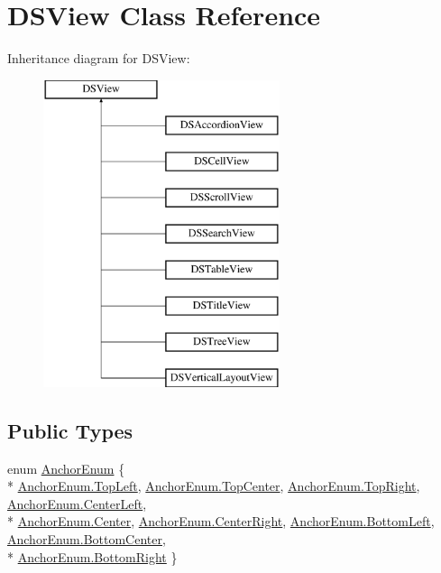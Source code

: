 \hypertarget{class_d_s_view}{\section{D\+S\+View Class Reference}
\label{class_d_s_view}
}
Inheritance diagram for D\+S\+View\+:\begin{figure}[H]
\begin{center}
\leavevmode
\includegraphics[height=9.000000cm]{class_d_s_view}
\end{center}
\end{figure}
\subsection*{Public Types}
\begin{DoxyCompactItemize}
\item 
enum \hyperlink{class_d_s_view_a8b41b9ec1b18bd33872a37cbd3a2dbe1}{Anchor\+Enum} \{ \\*
\hyperlink{class_d_s_view_a8b41b9ec1b18bd33872a37cbd3a2dbe1ab32beb056fbfe36afbabc6c88c81ab36}{Anchor\+Enum.\+Top\+Left}, 
\hyperlink{class_d_s_view_a8b41b9ec1b18bd33872a37cbd3a2dbe1a91b8ede24b7f93a98ae4dcaade15d468}{Anchor\+Enum.\+Top\+Center}, 
\hyperlink{class_d_s_view_a8b41b9ec1b18bd33872a37cbd3a2dbe1a1d85a557894c340c318493f33bfa8efb}{Anchor\+Enum.\+Top\+Right}, 
\hyperlink{class_d_s_view_a8b41b9ec1b18bd33872a37cbd3a2dbe1a9f44821a7b58abb265709f49e54ef8ca}{Anchor\+Enum.\+Center\+Left}, 
\\*
\hyperlink{class_d_s_view_a8b41b9ec1b18bd33872a37cbd3a2dbe1a4f1f6016fc9f3f2353c0cc7c67b292bd}{Anchor\+Enum.\+Center}, 
\hyperlink{class_d_s_view_a8b41b9ec1b18bd33872a37cbd3a2dbe1aa538ef718186c9e0967239bb60043d1f}{Anchor\+Enum.\+Center\+Right}, 
\hyperlink{class_d_s_view_a8b41b9ec1b18bd33872a37cbd3a2dbe1a98e5a1c44509157ebcaf46c515c78875}{Anchor\+Enum.\+Bottom\+Left}, 
\hyperlink{class_d_s_view_a8b41b9ec1b18bd33872a37cbd3a2dbe1abf7d9c8ad2f89a37cf5378b5fec0b420}{Anchor\+Enum.\+Bottom\+Center}, 
\\*
\hyperlink{class_d_s_view_a8b41b9ec1b18bd33872a37cbd3a2dbe1a9146bfc669fddc88db2c4d89297d0e9a}{Anchor\+Enum.\+Bottom\+Right}
 \}
\end{DoxyCompactItemize}
